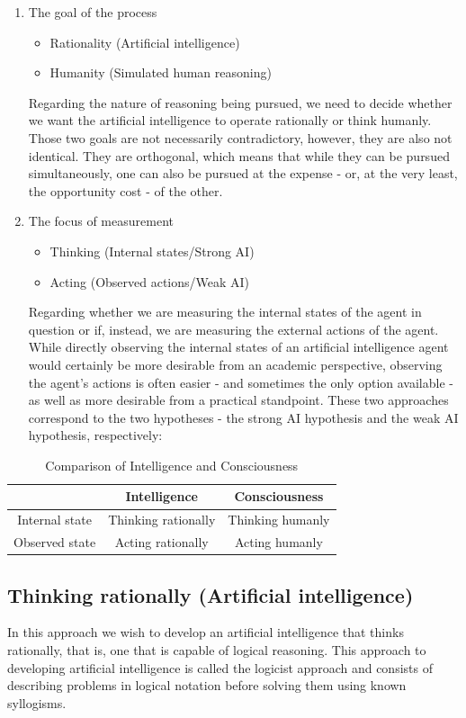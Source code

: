 \documentclass[masterthesis]{fer}
\begin{document}
\begin{enumerate}
\item{The goal of the process}
\begin{itemize}
\item{Rationality (Artificial intelligence)}
\item{Humanity (Simulated human reasoning)}
\end{itemize}
Regarding the nature of reasoning being pursued, we need to decide whether we want the artificial intelligence to operate rationally or think humanly. Those two goals are not necessarily contradictory, however, they are also not identical. They are orthogonal, which means that while they can be pursued simultaneously, one can also be pursued at the expense - or, at the very least, the opportunity cost - of the other.
\item{The focus of measurement}
\begin{itemize}
\item{Thinking (Internal states/Strong AI)}
\item{Acting (Observed actions/Weak AI)}
\end{itemize}
Regarding whether we are measuring the internal states of the agent in question or if, instead, we are measuring the external actions of the agent.
While directly observing the internal states of an artificial intelligence agent would certainly be more desirable from an academic perspective, observing the agent's actions is often easier - and sometimes the only option available - as well as more desirable from a practical standpoint.
These two approaches correspond to the two hypotheses - the strong AI hypothesis and the weak AI hypothesis, respectively:
\end{enumerate}

\begin{table}[h]
\centering
\begin{tabular}{|c|c|c|}
\hline
& Intelligence & Consciousness \\
\hline
\hline
Internal state & Thinking rationally & Thinking humanly \\
\hline
Observed state & Acting rationally & Acting humanly \\
\hline
\end{tabular}
\caption{Comparison of Intelligence and Consciousness}
\end{table}

\subsection{Thinking rationally (Artificial intelligence)}
In this approach we wish to develop an artificial intelligence that thinks rationally, that is, one that is capable of logical reasoning.
This approach to developing artificial intelligence is called the logicist approach and consists of describing problems in logical notation before solving them using known syllogisms.
\end{document}
